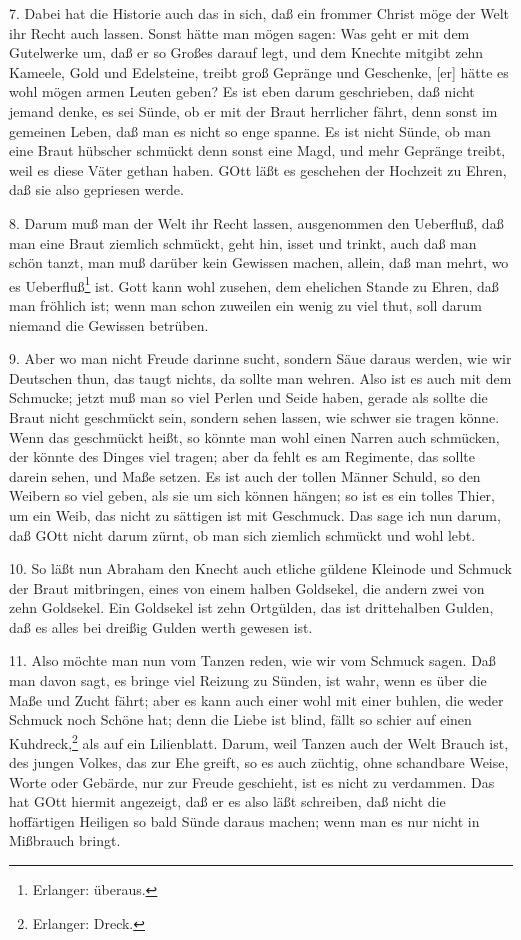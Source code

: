 7. Dabei hat die Historie auch das in sich, daß ein frommer Christ möge der Welt ihr Recht auch lassen. Sonst hätte man mögen sagen: Was geht er mit dem Gutelwerke um, daß er so Großes darauf legt, und dem Knechte mitgibt zehn Kameele, Gold und Edelsteine, treibt groß Gepränge und Geschenke, [er] hätte es wohl mögen armen Leuten geben? Es ist eben darum geschrieben, daß nicht jemand denke, es sei Sünde, ob er mit der Braut herrlicher fährt, denn sonst im gemeinen Leben, daß man es nicht so enge spanne. Es ist nicht Sünde, ob man eine Braut hübscher schmückt denn sonst eine Magd, und mehr Gepränge treibt, weil es diese Väter gethan haben. GOtt läßt es geschehen der Hochzeit zu Ehren, daß sie also gepriesen werde.

8. Darum muß man der Welt ihr Recht lassen, ausgenommen den Ueberfluß, daß man eine Braut ziemlich schmückt, geht hin, isset und trinkt, auch daß man schön tanzt, man muß darüber kein Gewissen machen, allein, daß man mehrt, wo es Ueberfluß\footnote{Erlanger: überaus.} ist. Gott kann wohl
zusehen, dem ehelichen Stande zu Ehren, daß man fröhlich ist; wenn man schon zuweilen ein wenig zu viel thut, soll darum niemand die Gewissen betrüben.

9. Aber wo man nicht Freude darinne sucht, sondern Säue daraus werden, wie wir Deutschen thun, das taugt nichts, da sollte man wehren. Also ist es auch mit dem Schmucke; jetzt muß man so viel Perlen und Seide haben, gerade als sollte die Braut nicht geschmückt sein, sondern sehen lassen, wie schwer sie tragen könne. Wenn das geschmückt heißt, so könnte man wohl einen Narren auch schmücken, der könnte des Dinges viel tragen; aber da fehlt es am Regimente, das sollte darein sehen, und Maße setzen. Es ist auch der tollen Männer Schuld, so den Weibern so viel geben, als sie um sich können hängen; so ist es ein tolles Thier, um ein Weib, das nicht zu sättigen ist mit Geschmuck. Das sage ich nun darum, daß GOtt nicht darum zürnt, ob man sich ziemlich schmückt und wohl lebt.

10. So läßt nun Abraham den Knecht auch etliche güldene Kleinode und Schmuck der Braut mitbringen, eines von einem halben Goldsekel, die andern zwei von zehn Goldsekel. Ein Goldsekel ist zehn Ortgülden, das ist drittehalben Gulden, daß es alles bei dreißig Gulden werth gewesen ist.

11. Also möchte man nun vom Tanzen reden, wie wir vom Schmuck sagen. Daß man davon sagt, es bringe viel Reizung zu Sünden, ist wahr, wenn es über die Maße und Zucht fährt; aber es kann auch einer wohl mit einer buhlen, die weder Schmuck noch Schöne hat; denn die Liebe ist blind, fällt so schier auf einen Kuhdreck,\footnote{Erlanger: Dreck.} als auf ein Lilienblatt. Darum, weil Tanzen auch der Welt Brauch ist, des jungen Volkes, das zur Ehe greift, so es auch züchtig, ohne schandbare Weise, Worte oder Gebärde, nur zur Freude geschieht, ist es nicht zu verdammen. Das hat GOtt hiermit angezeigt, daß er es also läßt schreiben, daß nicht die hoffärtigen Heiligen so bald Sünde daraus machen; wenn man es nur nicht in Mißbrauch bringt.

